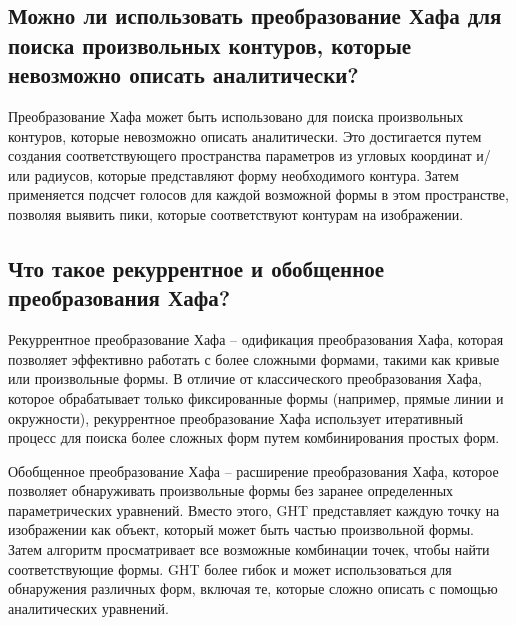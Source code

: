 \documentclass[a4paper, 16pt]{article}
\begin{document}
    \subsection{Можно ли использовать преобразование Хафа для поиска
    произвольных контуров, которые невозможно описать аналитически?}
    \noindent Преобразование Хафа может быть использовано для поиска произвольных контуров,
    которые невозможно описать аналитически. Это достигается путем создания соответствующего пространства параметров
    из угловых координат и/или радиусов, которые представляют форму необходимого контура. Затем применяется подсчет
    голосов для каждой возможной формы в этом пространстве, позволяя выявить пики, которые соответствуют контурам на изображении.


    \subsection{Что такое рекуррентное и обобщенное преобразования Хафа?}
    \noindent Рекуррентное преобразование Хафа -- одификация преобразования Хафа,
    которая позволяет эффективно работать с более сложными формами, такими как кривые или произвольные формы.
    В отличие от классического преобразования Хафа, которое обрабатывает только фиксированные формы
    (например, прямые линии и окружности), рекуррентное преобразование Хафа использует итеративный процесс
    для поиска более сложных форм путем комбинирования простых форм. 


    \noindent Обобщенное преобразование Хафа -- расширение преобразования Хафа, которое позволяет обнаруживать
    произвольные формы без заранее определенных параметрических уравнений. Вместо этого, GHT представляет каждую
    точку на изображении как объект, который может быть частью произвольной формы. Затем алгоритм просматривает
    все возможные комбинации точек, чтобы найти соответствующие формы. GHT более гибок и может использоваться
    для обнаружения различных форм, включая те, которые сложно описать с помощью аналитических уравнений.
\end{document}
